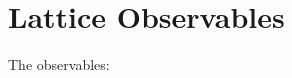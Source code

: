 \documentclass[../../RotatingBosons.tex]{subfiles}
\begin{document}
%



\section{\label{NRRBObservables}Lattice Observables}
The observables:
\end{document}
